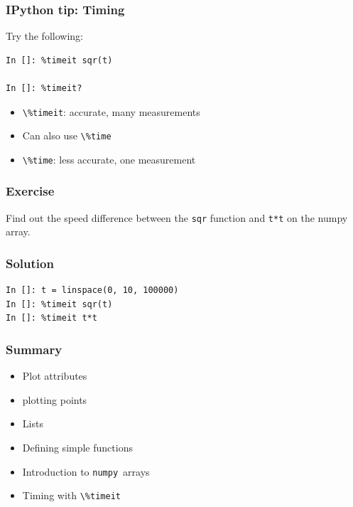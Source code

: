 \documentclass[14pt,compress]{beamer}
\newcounter{time}
\newcommand{\inctime}[1]{\addtocounter{time}{#1}{\tiny \thetime\ m}}
\newcommand{\typ}[1]{\lstinline{#1}}
\newcommand{\num}{\texttt{numpy}}
\begin{document}
\begin{frame}[fragile]
  \frametitle{IPython tip: Timing}

Try the following:
  \begin{lstlisting}
In []: %timeit sqr(t)

In []: %timeit?

  \end{lstlisting}

  \begin{itemize}
      \item \typ{\%timeit}: accurate, many measurements
      \item Can also use \typ{\%time}
      \item \typ{\%time}: less accurate, one measurement
  \end{itemize}

\inctime{10}
\end{frame}


\begin{frame}[fragile]
\frametitle{Exercise}
\begin{center}
    Find out the speed difference between the \typ{sqr} function and
    \typ{t*t} on the numpy array.
\end{center}

\end{frame}

\begin{frame}[fragile]
  \frametitle{Solution}
\begin{lstlisting}
In []: t = linspace(0, 10, 100000)
In []: %timeit sqr(t)
In []: %timeit t*t
\end{lstlisting}
  \inctime{5}
\end{frame}

\begin{frame}[fragile]
\frametitle{Summary}
\begin{itemize}
\item Plot attributes
\item plotting points
\item Lists
\item Defining simple functions
\item Introduction to \num\ arrays
\item Timing with \typ{\%timeit}
\end{itemize}
\end{frame}
\end{document}
